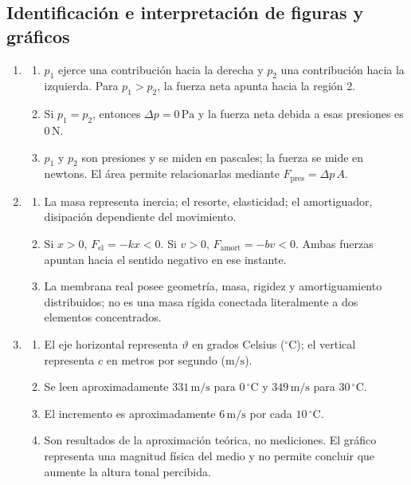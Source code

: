 \subsection*{Identificación e interpretación de figuras y gráficos}

\begin{enumerate}[label=\textbf{R\arabic*.},leftmargin=*]
    \item
    \begin{enumerate}[label=\alph*)]
        \item \(p_1\) ejerce una contribución hacia la derecha y \(p_2\) una
        contribución hacia la izquierda. Para \(p_1>p_2\), la fuerza neta
        apunta hacia la región 2.
        \item Si \(p_1=p_2\), entonces \(\Delta p=0\,\text{Pa}\) y la fuerza
        neta debida a esas presiones es \(0\,\text{N}\).
        \item \(p_1\) y \(p_2\) son presiones y se miden en pascales; la fuerza
        se mide en newtons. El área permite relacionarlas mediante
        \(F_\mathrm{pres}=\Delta p\,A\).
    \end{enumerate}

    \item
    \begin{enumerate}[label=\alph*)]
        \item La masa representa inercia; el resorte, elasticidad; el
        amortiguador, disipación dependiente del movimiento.
        \item Si \(x>0\), \(F_\mathrm{el}=-kx<0\). Si \(v>0\),
        \(F_\mathrm{amort}=-bv<0\). Ambas fuerzas apuntan hacia el sentido
        negativo en ese instante.
        \item La membrana real posee geometría, masa, rigidez y amortiguamiento
        distribuidos; no es una masa rígida conectada literalmente a dos
        elementos concentrados.
    \end{enumerate}

    \item
    \begin{enumerate}[label=\alph*)]
        \item El eje horizontal representa \(\vartheta\) en grados Celsius
        (\(^{\circ}\text{C}\)); el vertical representa \(c\) en metros por
        segundo (\(\text{m}/\text{s}\)).
        \item Se leen aproximadamente \(331\,\text{m}/\text{s}\) para
        \(0\,^{\circ}\text{C}\) y \(349\,\text{m}/\text{s}\) para
        \(30\,^{\circ}\text{C}\).
        \item El incremento es aproximadamente
        \(6\,\text{m}/\text{s}\) por cada \(10\,^{\circ}\text{C}\).
        \item Son resultados de la aproximación teórica, no mediciones. El
        gráfico representa una magnitud física del medio y no permite concluir
        que aumente la altura tonal percibida.
    \end{enumerate}


\end{enumerate}
